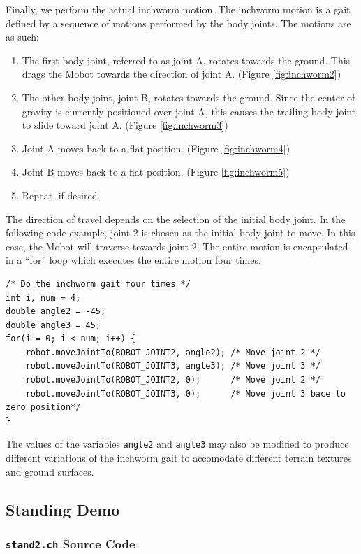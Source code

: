\documentclass{article}
\begin{document}
Finally, we perform the actual inchworm motion. The inchworm motion is a gait defined
by a sequence of motions performed by the body joints. The motions are as such:
\begin{enumerate}
\item The first body joint, referred to as joint A, rotates towards the ground.
This drags the Mobot towards the direction of joint A. (Figure \ref{fig:inchworm2})
\item The other body joint, joint B, rotates towards the ground. Since the center
of gravity is currently positioned over joint A, this causes the trailing body 
joint to slide toward joint A. (Figure \ref{fig:inchworm3})
\item Joint A moves back to a flat position. (Figure \ref{fig:inchworm4})
\item Joint B moves back to a flat position. (Figure \ref{fig:inchworm5})
\item Repeat, if desired.
\end{enumerate}
The direction of travel depends on the selection of the initial body joint. In
the following code example, joint 2 is chosen as the initial body joint to move.
In this case, the Mobot will traverse towards joint 2. The entire motion is
encapsulated in a ``for'' loop which executes the entire motion four times.
\begin{verbatim}
/* Do the inchworm gait four times */
int i, num = 4;
double angle2 = -45;
double angle3 = 45;
for(i = 0; i < num; i++) {
    robot.moveJointTo(ROBOT_JOINT2, angle2); /* Move joint 2 */
    robot.moveJointTo(ROBOT_JOINT3, angle3); /* Move joint 3 */
    robot.moveJointTo(ROBOT_JOINT2, 0);      /* Move joint 2 */
    robot.moveJointTo(ROBOT_JOINT3, 0);      /* Move joint 3 bace to zero position*/
}
\end{verbatim}
The values of the variables \texttt{angle2} and \texttt{angle3} may also be modified
to produce different variations of the inchworm gait to accomodate different terrain
textures and ground surfaces.

\subsection{Standing Demo}
\subsubsection{\texttt{stand2.ch} Source Code}

\end{document}

